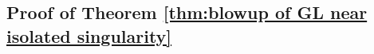 \documentclass{amsart}
\newtheorem{proposition}[theorem]{Proposition}
\theoremstyle{definition}
\theoremstyle{remark}
\newcommand{\0}{\boldsymbol{0}}
\begin{document}
\subsection{Proof of Theorem \ref{thm:blowup of GL near isolated singularity}}

\end{document}
